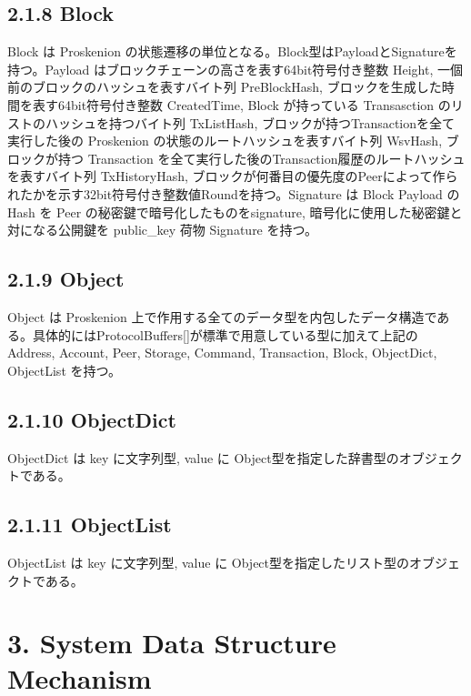 \hypertarget{block}{%
\subsection{2.1.8 Block}\label{block}}

Block は Proskenion
の状態遷移の単位となる。Block型はPayloadとSignatureを持つ。Payload
はブロックチェーンの高さを表す64bit符号付き整数 Height,
一個前のブロックのハッシュを表すバイト列 PreBlockHash,
ブロックを生成した時間を表す64bit符号付き整数 CreatedTime, Block
が持っている Transasction のリストのハッシュを持つバイト列 TxListHash,
ブロックが持つTransactionを全て実行した後の Proskenion
の状態のルートハッシュを表すバイト列 WsvHash, ブロックが持つ Transaction
を全て実行した後のTransaction履歴のルートハッシュを表すバイト列
TxHistoryHash,
ブロックが何番目の優先度のPeerによって作られたかを示す32bit符号付き整数値Roundを持つ。Signature
は Block Payload の Hash を Peer の秘密鍵で暗号化したものをsignature,
暗号化に使用した秘密鍵と対になる公開鍵を public\_key 荷物 Signature
を持つ。

\hypertarget{object}{%
\subsection{2.1.9 Object}\label{object}}

Object は Proskenion
上で作用する全てのデータ型を内包したデータ構造である。具体的にはProtocolBuffers{[}{]}が標準で用意している型に加えて上記のAddress,
Account, Peer, Storage, Command, Transaction, Block, ObjectDict,
ObjectList を持つ。

\hypertarget{objectdict}{%
\subsection{2.1.10 ObjectDict}\label{objectdict}}

ObjectDict は key に文字列型, value に
Object型を指定した辞書型のオブジェクトである。

\hypertarget{objectlist}{%
\subsection{2.1.11 ObjectList}\label{objectlist}}

ObjectList は key に文字列型, value に
Object型を指定したリスト型のオブジェクトである。

\hypertarget{system-data-structure-mechanism}{%
\section{3. System Data Structure
Mechanism}\label{system-data-structure-mechanism}}

